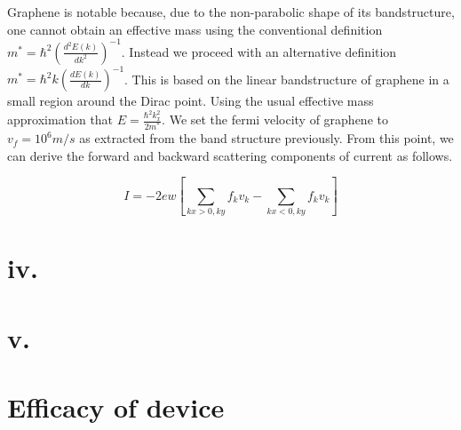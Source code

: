 \documentclass[11pt]{article}
\begin{document}
Graphene is notable because, due to the non-parabolic shape of its bandstructure, one cannot obtain an effective mass\cite{ariel2012} using the conventional definition $m^{*} = \hbar^2(\frac{d^2E(k)}{dk^2})^{-1}$. Instead we proceed with an alternative definition $m^{*} = \hbar^2k(\frac{dE(k)}{dk})^{-1}$. This is based on the linear bandstructure of graphene in a small region around the Dirac point. Using the usual effective mass approximation that $E=\frac{\hbar^2k_x^2}{2m^{*}}$. We set the fermi velocity of graphene to $v_f = 10^6 m/s$ as extracted from the band structure previously. From this point, we can derive the forward and backward scattering components of current as follows. 

$$I = -2ew[\sum_{kx>0,ky}{f_kv_k} - \sum_{kx<0,ky}{f_kv_k}]$$
\vspace{1em}



\section*{iv.}

\section*{v.}

\section*{Efficacy of device}
\end{document}
